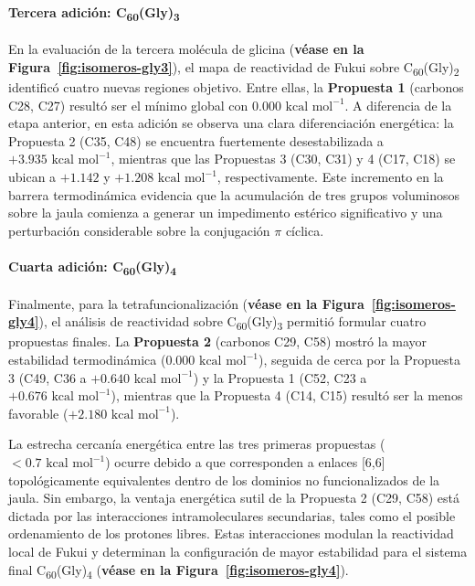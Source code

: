 \paragraph{Tercera adición: C\textsubscript{60}(Gly)\textsubscript{3}}
En la evaluación de la tercera molécula de glicina (\textbf{véase en la Figura~\ref{fig:isomeros-gly3}}), el mapa de reactividad de Fukui sobre C\textsubscript{60}(Gly)\textsubscript{2} identificó cuatro nuevas regiones objetivo. Entre ellas, la \textbf{Propuesta 1} (carbonos C28, C27) resultó ser el mínimo global con $0.000\text{ kcal mol}^{-1}$. A diferencia de la etapa anterior, en esta adición se observa una clara diferenciación energética: la Propuesta 2 (C35, C48) se encuentra fuertemente desestabilizada a $+3.935\text{ kcal mol}^{-1}$, mientras que las Propuestas 3 (C30, C31) y 4 (C17, C18) se ubican a $+1.142$ y $+1.208\text{ kcal mol}^{-1}$, respectivamente. Este incremento en la barrera termodinámica evidencia que la acumulación de tres grupos voluminosos sobre la jaula comienza a generar un impedimento estérico significativo y una perturbación considerable sobre la conjugación $\pi$ cíclica.

\paragraph{Cuarta adición: C\textsubscript{60}(Gly)\textsubscript{4}}
Finalmente, para la tetrafuncionalización (\textbf{véase en la Figura~\ref{fig:isomeros-gly4}}), el análisis de reactividad sobre C\textsubscript{60}(Gly)\textsubscript{3} permitió formular cuatro propuestas finales. La \textbf{Propuesta 2} (carbonos C29, C58) mostró la mayor estabilidad termodinámica ($0.000\text{ kcal mol}^{-1}$), seguida de cerca por la Propuesta 3 (C49, C36 a $+0.640\text{ kcal mol}^{-1}$) y la Propuesta 1 (C52, C23 a $+0.676\text{ kcal mol}^{-1}$), mientras que la Propuesta 4 (C14, C15) resultó ser la menos favorable ($+2.180\text{ kcal mol}^{-1}$). 

La estrecha cercanía energética entre las tres primeras propuestas ($< 0.7\text{ kcal mol}^{-1}$) ocurre debido a que corresponden a enlaces [6,6] topológicamente equivalentes dentro de los dominios no funcionalizados de la jaula. Sin embargo, la ventaja energética sutil de la Propuesta 2 (C29, C58) está dictada por las interacciones intramoleculares secundarias, tales como el posible ordenamiento de los protones libres. Estas interacciones modulan la reactividad local de Fukui y determinan la configuración de mayor estabilidad para el sistema final C\textsubscript{60}(Gly)\textsubscript{4} (\textbf{véase en la Figura~\ref{fig:isomeros-gly4}}).  
